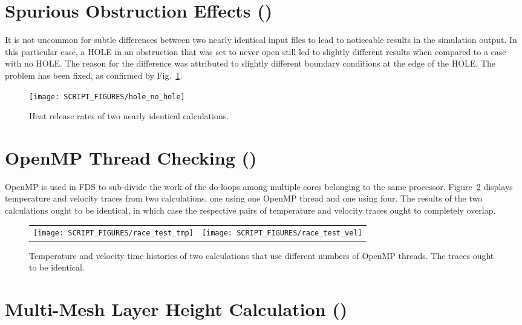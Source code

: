 \documentclass[11pt]{book}
\begin{document}
\section{Spurious Obstruction Effects (\texorpdfstring{}{hole})}
\label{hole}

It is not uncommon for subtle differences between two nearly identical input files to lead to noticeable results in the simulation output. In this particular case, a {\ct HOLE} in an obstruction that was set to never open still led to slightly different results when compared to a case with no {\ct HOLE}. The reason for the difference was attributed to slightly different boundary conditions at the edge of the {\ct HOLE}. The problem has been fixed, as confirmed by Fig.~\ref{hole_fig}.

\begin{figure}[!ht]
\centering
\texttt{[image: SCRIPT\_FIGURES/hole\_no\_hole]}
\caption[Results of the  test case]{Heat release rates of two nearly identical calculations.}
\label{hole_fig}
\end{figure}


\section{OpenMP Thread Checking (\texorpdfstring{}{race\_test})}
\label{race_test}

OpenMP is used in FDS to sub-divide the work of the do-loops among multiple cores belonging to the same processor. Figure~\ref{race_test_fig} displays temperature and velocity traces from two calculations, one using one OpenMP thread and one using four. The results of the two calculations ought to be identical, in which case the respective pairs of temperature and velocity traces ought to completely overlap.

\begin{figure}[!ht]
\begin{tabular*}{\textwidth}{lr}
\texttt{[image: SCRIPT\_FIGURES/race\_test\_tmp]} &
\texttt{[image: SCRIPT\_FIGURES/race\_test\_vel]}
\end{tabular*}
\caption[Result of the ]{Temperature and velocity time histories of two calculations that use different numbers of OpenMP threads. The traces ought to be identical.}
\label{race_test_fig}
\end{figure}


\section{Multi-Mesh Layer Height Calculation (\texorpdfstring{}{layer})}
\label{layer}
\end{document}
